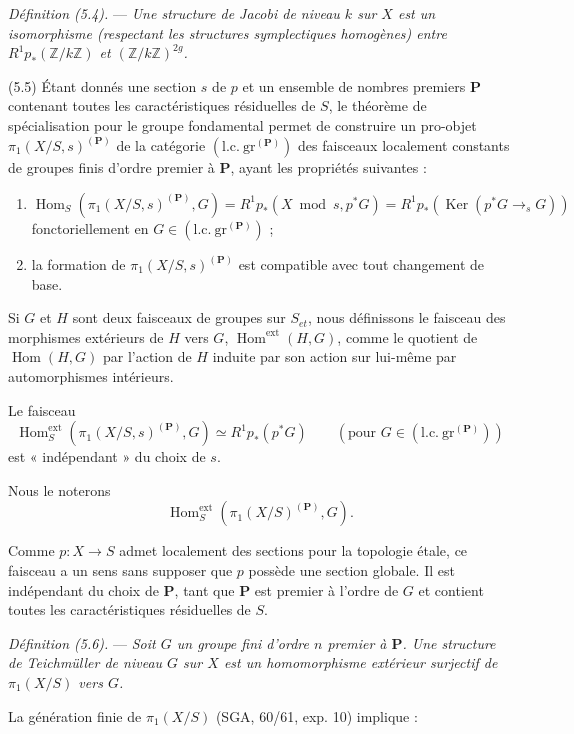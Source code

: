 \documentclass[10pt]{article}
\newcommand{\Hom}{\operatorname{Hom}}
\begin{document}
\medskip
\noindent\emph{Définition (5.4).} --- \emph{Une structure de Jacobi de niveau $k$ sur $X$ est un isomorphisme (respectant les structures symplectiques homogènes) entre $R^1p_*(\mathbb Z/k\mathbb Z)$ et $(\mathbb Z/k\mathbb Z)^{2g}$.}

\medskip
\noindent(5.5) Étant donnés une section $s$ de $p$ et un ensemble de nombres premiers $\mathbf P$ contenant toutes les caractéristiques résiduelles de $S$, le théorème de spécialisation pour le groupe fondamental permet de construire un pro-objet $\pi_1(X/S,s)^{(\mathbf P)}$ de la catégorie $(\mathrm{l.c.}\ \mathrm{gr}^{(\mathbf P)})$ des faisceaux localement constants de groupes finis d'ordre premier à $\mathbf P$, ayant les propriétés suivantes :
\begin{enumerate}[label=(\roman*)]
\item $\Hom_S(\pi_1(X/S,s)^{(\mathbf P)},G)=R^1p_*(X\bmod s,p^*G)=R^1p_*(\operatorname{Ker}(p^*G\to_s G))$ fonctoriellement en $G\in(\mathrm{l.c.}\ \mathrm{gr}^{(\mathbf P)})$ ;
\item la formation de $\pi_1(X/S,s)^{(\mathbf P)}$ est compatible avec tout changement de base.
\end{enumerate}

Si $G$ et $H$ sont deux faisceaux de groupes sur $S_{et}$, nous définissons le faisceau des morphismes extérieurs de $H$ vers $G$, $\Hom^{\mathrm{ext}}(H,G)$, comme le quotient de $\Hom(H,G)$ par l'action de $H$ induite par son action sur lui-même par automorphismes intérieurs.

Le faisceau
\[
\Hom_S^{\mathrm{ext}}(\pi_1(X/S,s)^{(\mathbf P)},G)\simeq R^1p_*(p^*G)
\qquad ( \text{pour }G\in(\mathrm{l.c.}\ \mathrm{gr}^{(\mathbf P)}) )
\]
est « indépendant » du choix de $s$.

Nous le noterons
\[
\Hom_S^{\mathrm{ext}}(\pi_1(X/S)^{(\mathbf P)},G).
\]

Comme $p:X\to S$ admet localement des sections pour la topologie étale, ce faisceau a un sens sans supposer que $p$ possède une section globale. Il est indépendant du choix de $\mathbf P$, tant que $\mathbf P$ est premier à l'ordre de $G$ et contient toutes les caractéristiques résiduelles de $S$.

\medskip
\noindent\emph{Définition (5.6).} --- \emph{Soit $G$ un groupe fini d'ordre $n$ premier à $\mathbf P$. Une structure de Teichmüller de niveau $G$ sur $X$ est un homomorphisme extérieur surjectif de $\pi_1(X/S)$ vers $G$.}

La génération finie de $\pi_1(X/S)$ (SGA, 60/61, exp. 10) implique :
\end{document}
